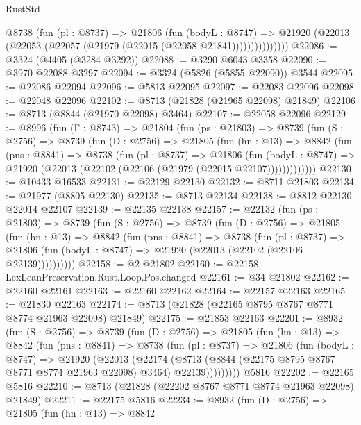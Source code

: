\begin{lexlean}{RustStd}
\begin{coremodule}
                @8738
                  (fun (pl : @8737) =>
                  @21806
                    (fun (bodyL : @8747) =>
                    @21920 (@22013 (@22053 (@22057 (@21979 (@22015 (@22058 @21841)))))))))))))))
@22086 := @3324 (@4405 (@3284 @3292))
@22088 := @3290 @6043 @3358
@22090 := @3970 @22088 @3297
@22094 := @3324 (@5826 (@5855 @22090)) @3544
@22095 := @22086 @22094
@22096 := @5813 @22095
@22097 := @22083 @22096
@22098 := @22048 @22096
@22102 := @8713 (@21828 (@21965 @22098) @21849)
@22106 := @8713 (@8844 (@21970 @22098) @3464)
@22107 := @22058 @22096
@22129 := @8996
    (fun (Γ : @8743) =>
    @21804
      (fun (ps : @21803) =>
      @8739
        (fun (S : @2756) =>
        @8739
          (fun (D : @2756) =>
          @21805
            (fun (hn : @13) =>
            @8842
              (fun (pns : @8841) =>
              @8738
                (fun (pl : @8737) =>
                @21806
                  (fun (bodyL : @8747) =>
                  @21920 (@22013 (@22102 (@22106 (@21979 (@22015 @22107)))))))))))))
@22130 := @10433 @16533
@22131 := @22129 @22130
@22132 := @8711 @21803
@22134 := @21977 (@8805 @22130)
@22135 := @8713 @22134
@22138 := @8812 @22130 @22014 @22107
@22139 := @22135 @22138
@22157 := @22132
    (fun (ps : @21803) =>
    @8739
      (fun (S : @2756) =>
      @8739
        (fun (D : @2756) =>
        @21805
          (fun (hn : @13) =>
          @8842
            (fun (pns : @8841) =>
            @8738
              (fun (pl : @8737) =>
              @21806 (fun (bodyL : @8747) => @21920 (@22013 (@22102 (@22106 @22139))))))))))
@22158 := @2 @21802
@22160 := @22158 LexLeanPreservation.Rust.Loop.Pos.changed
@22161 := @34 @21802
@22162 := @22160 @22161
@22163 := @22160 @22162
@22164 := @22157 @22163
@22165 := @21830 @22163
@22174 := @8713 (@21828 (@22165 @8795 @8767 @8771 @8774 @21963 @22098) @21849)
@22175 := @21853 @22163
@22201 := @8932
    (fun (S : @2756) =>
    @8739
      (fun (D : @2756) =>
      @21805
        (fun (hn : @13) =>
        @8842
          (fun (pns : @8841) =>
          @8738
            (fun (pl : @8737) =>
            @21806
              (fun (bodyL : @8747) =>
              @21920
                (@22013
                  (@22174
                    (@8713
                      (@8844 (@22175 @8795 @8767 @8771 @8774 @21963 @22098) @3464)
                      @22139)))))))))
    @5816
@22202 := @22165 @5816
@22210 := @8713 (@21828 (@22202 @8767 @8771 @8774 @21963 @22098) @21849)
@22211 := @22175 @5816
@22234 := @8932
    (fun (D : @2756) =>
    @21805
      (fun (hn : @13) =>
      @8842

\end{coremodule}
\end{lexlean}
